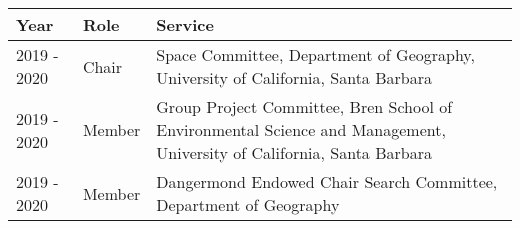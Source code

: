 
\begin{longtable}{llp{12cm}}
Year & Role & Service\\
\hline 
\endhead 
2019 - 2020 & Chair & Space Committee, Department of Geography, University of California, Santa Barbara \\
2019 - 2020 & Member & Group Project Committee, Bren School of Environmental Science and Management, University of California, Santa Barbara \\
2019 - 2020 & Member & Dangermond Endowed Chair Search Committee, Department of Geography \\
\end{longtable}

